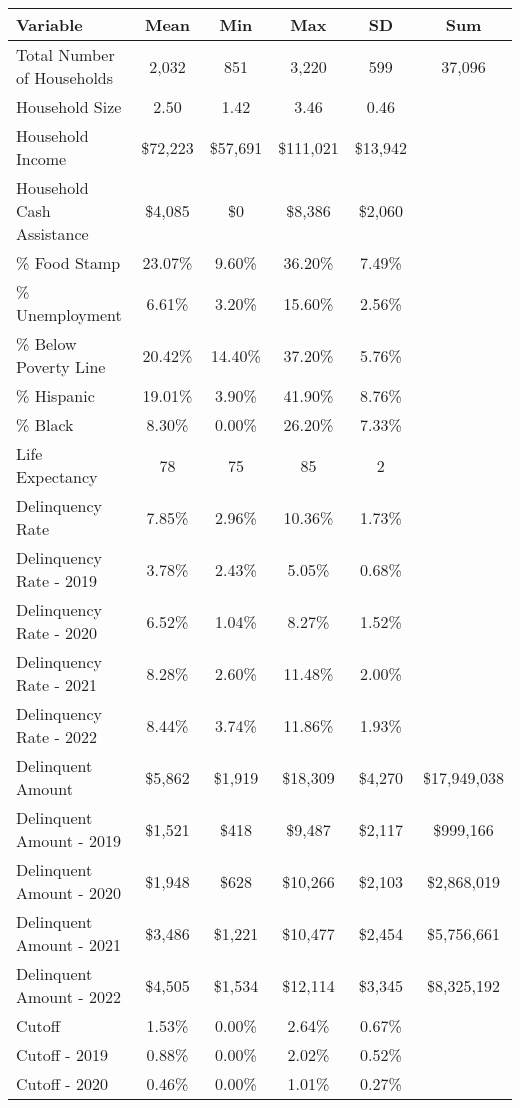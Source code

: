 \begin{tabular}{l|c|c|c|c|c}
\toprule 
\midrule 
Variable & Mean & Min & Max & SD & Sum \\
\midrule 
Total Number of Households & 2,032 & 851 & 3,220 & 599 & 37,096 \\
\quad Household Size & 2.50 & 1.42 & 3.46 & 0.46 \\
Household Income & \$72,223 & \$57,691 & \$111,021 & \$13,942 \\
\quad Household Cash Assistance & \$4,085 & \$0 & \$8,386 & \$2,060 \\
\% Food Stamp & 23.07\% & 9.60\% & 36.20\% & 7.49\% \\
\% Unemployment & 6.61\% & 3.20\% & 15.60\% & 2.56\% \\
\% Below Poverty Line & 20.42\% & 14.40\% & 37.20\% & 5.76\% \\
\% Hispanic & 19.01\% & 3.90\% & 41.90\% & 8.76\% \\
\% Black & 8.30\% & 0.00\% & 26.20\% & 7.33\% \\
Life Expectancy & 78 & 75 & 85 & 2 \\
\midrule 
Delinquency Rate & 7.85\% & 2.96\% & 10.36\% & 1.73\% \\
\quad Delinquency Rate - 2019 & 3.78\% & 2.43\% & 5.05\% & 0.68\% \\
\quad Delinquency Rate - 2020 & 6.52\% & 1.04\% & 8.27\% & 1.52\% \\
\quad Delinquency Rate - 2021 & 8.28\% & 2.60\% & 11.48\% & 2.00\% \\
\quad Delinquency Rate - 2022 & 8.44\% & 3.74\% & 11.86\% & 1.93\% \\
\midrule 
Delinquent Amount & \$5,862 & \$1,919 & \$18,309 & \$4,270 & \$17,949,038 \\
\quad Delinquent Amount - 2019 & \$1,521 & \$418 & \$9,487 & \$2,117 & \$999,166 \\
\quad Delinquent Amount - 2020 & \$1,948 & \$628 & \$10,266 & \$2,103 & \$2,868,019 \\
\quad Delinquent Amount - 2021 & \$3,486 & \$1,221 & \$10,477 & \$2,454 & \$5,756,661 \\
\quad Delinquent Amount - 2022 & \$4,505 & \$1,534 & \$12,114 & \$3,345 & \$8,325,192 \\
\midrule 
Cutoff & 1.53\% & 0.00\% & 2.64\% & 0.67\% \\
\quad Cutoff - 2019 & 0.88\% & 0.00\% & 2.02\% & 0.52\% \\
\quad Cutoff - 2020 & 0.46\% & 0.00\% & 1.01\% & 0.27\% \\

\end{tabular}
